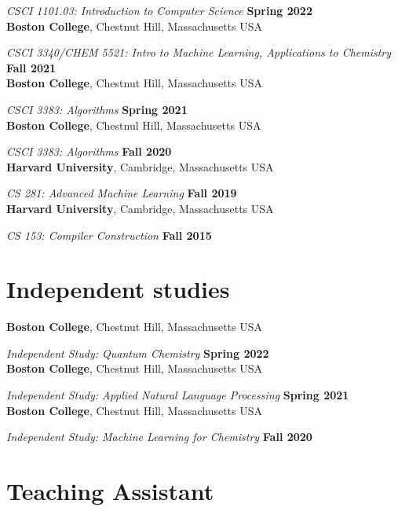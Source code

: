 \documentclass[margin,line]{res}
\begin{document}
\begin{resume}
{\em CSCI 1101.03: Introduction  to Computer Science} \hfill {\bf Spring 2022}\\
{\bf Boston College}, Chestnut Hill, Massachusetts USA
\vspace{-.4cm}

{\em CSCI 3340/CHEM 5521: Intro to Machine Learning, Applications to Chemistry} \hfill {\bf Fall 2021}\\
{\bf Boston College}, Chestnut Hill, Massachusetts USA
\vspace{-.4cm}

{\em CSCI 3383: Algorithms} \hfill {\bf Spring 2021}\\
{\bf Boston College}, Chestnul Hill, Massachusetts USA
\vspace{-.4cm}

{\em CSCI 3383: Algorithms} \hfill {\bf Fall 2020}\\
{\bf Harvard University}, Cambridge, Massachusetts USA
\vspace{-.4cm}

{\em CS 281: Advanced Machine Learning} \hfill {\bf Fall 2019}\\
{\bf Harvard University}, Cambridge, Massachusetts USA
\vspace{-.4cm}

{\em CS 153: Compiler Construction} \hfill {\bf Fall 2015}\\


\section{\sc Independent studies}

{\bf Boston College}, Chestnut Hill, Massachusetts USA
\vspace{-.4cm}

{\em Independent Study: Quantum Chemistry} \hfill {\bf Spring 2022}\\
{\bf Boston College}, Chestnut Hill, Massachusetts USA
\vspace{-.4cm}

{\em Independent Study: Applied Natural Language Processing} \hfill {\bf Spring 2021}\\
{\bf Boston College}, Chestnut Hill, Massachusetts USA
\vspace{-.4cm}

{\em Independent Study: Machine Learning for Chemistry} \hfill {\bf Fall 2020}\\

\section{\sc Teaching Assistant}


\end{resume}
\end{document}
